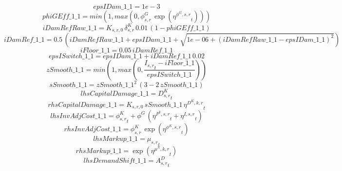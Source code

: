 \begin{dmath*}
epsIDam\_1\_1 = 1e-3
\end{dmath*}
\begin{dmath*}
phiGEff\_1\_1 = min(1,max(0,{{\phi^{G}_{s,r}}}\, \exp\left({{\eta^{\phi^{G},s,r}}}_{t}\right)))
\end{dmath*}
\begin{dmath*}
iDamRefRaw\_1\_1 = {{K_{s,r,0}}}\, {{\delta^{K}_{s,r}}}\, 0.01\, \left(1-{phiGEff\_1\_1}\right)
\end{dmath*}
\begin{dmath*}
iDamRef\_1\_1 = 0.5\, \left({iDamRefRaw\_1\_1}+{epsIDam\_1\_1}+\sqrt{1e-06+\left({iDamRefRaw\_1\_1}-{epsIDam\_1\_1}\right)^{2}}\right)
\end{dmath*}
\begin{dmath*}
iFloor\_1\_1 = 0.05\, {iDamRef\_1\_1}
\end{dmath*}
\begin{dmath*}
epsISwitch\_1\_1 = {epsIDam\_1\_1}+{iDamRef\_1\_1}\, 0.02
\end{dmath*}
\begin{dmath*}
zSmooth\_1\_1 = min(1,max(0,\frac{{{I_{s,r}}}_{t}-{iFloor\_1\_1}}{{epsISwitch\_1\_1}}))
\end{dmath*}
\begin{dmath*}
sSmooth\_1\_1 = {zSmooth\_1\_1}^{2}\, \left(3-2\, {zSmooth\_1\_1}\right)
\end{dmath*}
\begin{dmath*}
lhsCapitalDamage\_1\_1 = {{D^K_{s,r}}}_{t}
\end{dmath*}
\begin{dmath*}
rhsCapitalDamage\_1\_1 = {{K_{s,r,0}}}\, {sSmooth\_1\_1}\, {{\eta^{D^{K},k,r}}}_{t}
\end{dmath*}
\begin{dmath*}
lhsInvAdjCost\_1\_1 = {{\phi^K_{s,r}}}_{t}+{{\phi^{G}}}\, \left({{\eta^{P^k,s,r}}}_{t}+{{\eta^{I,s,r}}}_{t}\right)
\end{dmath*}
\begin{dmath*}
rhsInvAdjCost\_1\_1 = {{\phi^{K}_{s,r}}}\, \exp\left({{\eta^{\phi^{K},{s,r}}}}_{t}\right)
\end{dmath*}
\begin{dmath*}
lhsMarkup\_1\_1 = {{\mu_{s,r}}}_{t}
\end{dmath*}
\begin{dmath*}
rhsMarkup\_1\_1 = \exp\left({{\eta^{\mu^{N},k,r}}}_{t}\right)
\end{dmath*}
\begin{dmath*}
lhsDemandShift\_1\_1 = {{A^{D}_{s,r}}}_{t}
\end{dmath*}
